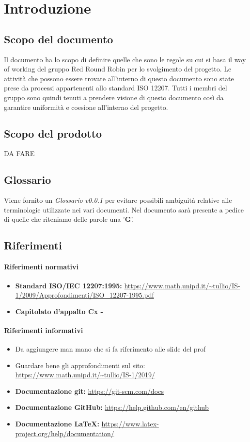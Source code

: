 \section{Introduzione}
	\subsection{Scopo del documento}
		Il documento ha lo scopo di definire quelle che sono le regole su cui si basa il way of working del gruppo Red Round Robin per lo svolgimento del progetto. Le attività che possono essere trovate all'interno di questo documento sono state prese da processi appartenenti allo standard ISO 12207. Tutti i membri del gruppo sono quindi tenuti a prendere visione di questo documento così da garantire uniformità e coesione all'interno del progetto.   
	\subsection{Scopo del prodotto}
		DA FARE
	\subsection{Glossario}
		Viene fornito un \textit{Glossario v0.0.1} per evitare possibili ambiguità relative alle terminologie utilizzate nei vari documenti. Nel documento sarà presente a pedice di quelle che riteniamo delle parole una '\textbf{G}'.
	\subsection{Riferimenti}

		\paragraph{Riferimenti normativi}
			\begin{itemize}
				\item \textbf{Standard ISO/IEC 12207:1995: } 
				\url{https://www.math.unipd.it/~tullio/IS-1/2009/Approfondimenti/ISO_12207-1995.pdf}
				\item \textbf{Capitolato d'appalto Cx -} 
				\url{}
			\end{itemize}	
		\paragraph{Riferimenti informativi}
			\begin{itemize}
				\item Da aggiungere man mano che si fa riferimento alle slide del prof
				\item Guardare bene gli approfondimenti sul sito:
				\url{https://www.math.unipd.it/~tullio/IS-1/2019/}
				\item \textbf{Documentazione git: }\url{https://git-scm.com/docs} 
				\item \textbf{Documentazione GitHub: }\url{https://help.github.com/en/github}
				\item \textbf{Documentazione LaTeX: }\url{https://www.latex-project.org/help/documentation/}
			\end{itemize}
		

